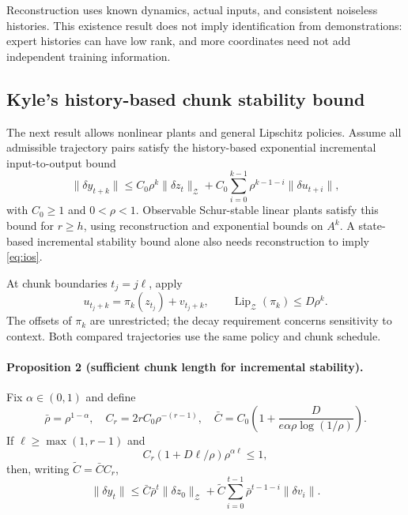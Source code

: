 \documentclass{l4dc2026}
\newcommand{\norm}[1]{\lVert#1\rVert}
\begin{document}
Reconstruction uses known dynamics, actual inputs, and consistent noiseless histories. This existence result does not imply identification from demonstrations: expert histories can have low rank, and more coordinates need not add independent training information.

\subsection{Kyle's history-based chunk stability bound}
The next result allows nonlinear plants and general Lipschitz policies. Assume all admissible trajectory pairs satisfy the history-based exponential incremental input-to-output bound
\begin{equation}\label{eq:ios}
\norm{\delta y_{t+k}}\le C_0\rho^k\norm{\delta z_t}_{\mathcal Z}
+C_0\sum_{i=0}^{k-1}\rho^{k-1-i}\norm{\delta u_{t+i}},
\end{equation}
with $C_0\ge1$ and $0<\rho<1$. Observable Schur-stable linear plants satisfy this bound for $r\ge h$, using reconstruction and exponential bounds on $A^k$. A state-based incremental stability bound alone also needs reconstruction to imply \eqref{eq:ios}.

At chunk boundaries $t_j=j\ell$, apply
\[
u_{t_j+k}=\pi_k(z_{t_j})+v_{t_j+k},\qquad
\operatorname{Lip}_{\mathcal Z}(\pi_k)\le D\rho^k.
\]
The offsets of $\pi_k$ are unrestricted; the decay requirement concerns sensitivity to context. Both compared trajectories use the same policy and chunk schedule.

\paragraph{Proposition 2 (sufficient chunk length for incremental stability).}
Fix $\alpha\in(0,1)$ and define
\[
\bar\rho=\rho^{1-\alpha},\quad C_r=2rC_0\rho^{-(r-1)},\quad
\bar C=C_0\left(1+\frac{D}{e\alpha\rho\log(1/\rho)}\right).
\]
If $\ell\ge\max(1,r-1)$ and
\begin{equation}\label{eq:criterion}
C_r(1+D\ell/\rho)\rho^{\alpha\ell}\le1,
\end{equation}
then, writing $\widetilde C=\bar CC_r$,
\begin{equation}\label{eq:closed}
\norm{\delta y_t}\le\bar C\bar\rho^t\norm{\delta z_0}_{\mathcal Z}
+\widetilde C\sum_{i=0}^{t-1}\bar\rho^{t-1-i}\norm{\delta v_i}.
\end{equation}
\end{document}
